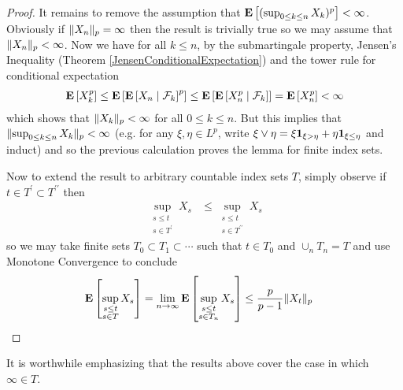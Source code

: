 \begin{proof}
It remains to remove the assumption that $\expectation{(\sup_{0 \leq k \leq n}
  X_k)^{p}} < \infty$.  Obviously if $\norm{X_n}_p = \infty$ then the
result is trivially true so we may assume that $\norm{X_n}_p < \infty$.
Now we have for all $k\leq n$, by the
submartingale property, Jensen's Inequality (Theorem \ref{JensenConditionalExpectation}) and the tower rule for conditional expectation
\begin{align*}
\expectation{X_k^p} \leq
\expectation{\cexpectationlong{\mathcal{F}_k}{X_n}^p} \leq 
\expectation{\cexpectationlong{\mathcal{F}_k}{X_n^p}} =
\expectation{X_n^p} < \infty
\end{align*}
which shows that $\norm{X_k}_p < \infty$ for all $0\leq k \leq n$.
But this implies that $\norm{\sup_{0 \leq k \leq n} X_k}_p < \infty$
(e.g. for any $\xi, \eta \in L^p$, write $\xi \vee \eta =
\xi\characteristic{\xi > \eta} + \eta\characteristic{\xi \leq \eta}$
and induct) and so the previous calculation proves the lemma for
finite index sets.

Now to extend the result to arbitrary countable index sets $T$, simply
observe if $t \in T^\prime \subset T^{\prime \prime}$ then 
\begin{align*}
\sup_{\substack{s \leq t \\ s \in T^\prime }} X_s &\leq
\sup_{\substack{s \leq t \\ s \in T^{\prime \prime}}} X_s
\end{align*}
so we may take finite sets $T_0 \subset T_1 \subset \cdots$ such that
$t \in T_0$ and $\cup_n T_n = T$ and use Monotone Convergence to
conclude 
\begin{align*}
\expectation{\sup_{\substack{s \leq t \\ s \in T }} X_s} &= 
\lim_{n \to    \infty} \expectation{\sup_{\substack{s \leq t \\ s \in T_n }} X_s} \leq 
\frac{p}{p-1}\norm{X_t}_p
\end{align*}
\end{proof}

It is worthwhile emphasizing that the results above cover the case in
which $\infty \in T$.  

